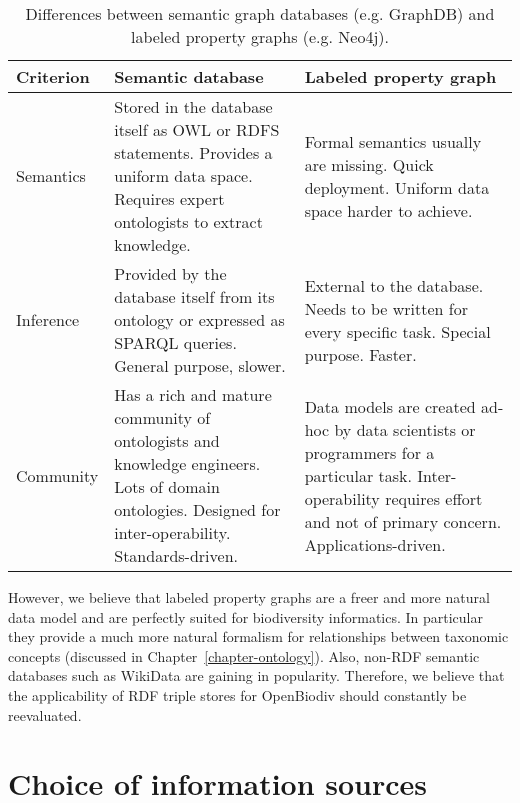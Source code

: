 \begin{table}
\caption{Differences between semantic graph databases (e.g. GraphDB) and labeled property graphs (e.g. Neo4j).}
\begin{tabular}{>{\centering\arraybackslash}m{2.5cm}|>{\centering\arraybackslash}m{4.2cm}|>{\centering\arraybackslash}m{4.2cm}}
Criterion   & Semantic database & Labeled property graph\\
\hline
Semantics   & Stored in the database itself as OWL or RDFS statements. Provides a uniform data space. Requires expert ontologists to extract knowledge.
            & Formal semantics usually are missing. Quick deployment. Uniform data space harder to achieve.\\
\hline
Inference   & Provided by the database itself from its ontology or expressed as SPARQL queries. General purpose, slower.
            & External to the database. Needs to be written for every specific task. Special purpose. Faster.\\
\hline
Community   & Has a rich and mature community of ontologists and knowledge engineers. Lots of domain ontologies. Designed for inter-operability. Standards-driven.
            & Data models are created ad-hoc by data scientists or programmers for a particular task. Inter-operability requires effort and not of primary concern. Applications-driven.\\
\hline
\end{tabular}
\label{graphdb-vs-neo4k}
\end{table}

However, we believe that labeled property graphs are a freer and more natural data model and are perfectly suited for biodiversity informatics. In particular they provide a much more natural formalism for relationships between taxonomic concepts (discussed in Chapter~\ref{chapter-ontology}). Also, non-RDF semantic databases such as \mbox{WikiData} are gaining in popularity. Therefore, we believe that the applicability of RDF triple stores for OpenBiodiv should constantly be reevaluated.

\section{Choice of information sources}

